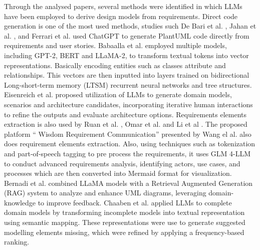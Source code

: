 Through the analysed papers, several methods were identified in which LLMs have been employed to derive design models from requirements. 
Direct code generation is one of the most used methods, studies such De Bari et al. \cite{1deBari2024}, Jahan et al. \cite{4jahan2024}, and Ferrari et al. \cite{5ferrari2024} used ChatGPT to generate PlantUML \cite{plantuml} code directly from requirements and user stories.
Babaalla et al. \cite{2babaalla2024} employed multiple models, including GPT-2, BERT and LLaMA-2, to transform textual tokens into vector representations. Basically encoding entities such as classes attribute and relationships. This vectors are then inputted into layers trained on bidirectional Long-short-term memory (LTSM) recurrent neural networks and tree structures.
Eisenreich et al. \cite{7eisenreich2024} proposed utilization of LLMs to generate domain models, scenarios and architecture candidates, incorporating iterative human interactions to refine the outputs and evaluate architecture options. 
Requirements elements extraction is also used by Ruan et al. \cite{9ruan2023}, Omar et al. \cite{11omar2023} and Li et al \cite{12li2024}. 
The proposed platform “ Wisdom Requirement Communication” presented by Wang el al. \cite{8z_wang2024} also does requirement elements extraction. Also, using techniques such as tokenization and part-of-speech tagging to pre process the requirements,  it uses GLM 4-LLM to conduct advanced requirements analysis, identifying actors, use cases, and processes which are then converted into Mermaid format for visualization.
Bernadi et al. \cite{13benardi2024} combined LLaMA models with a Retrieval Augmented Generation (RAG) system to analyze and enhance UML diagrams, leveraging domain-knowledge to improve feedback.
Chaaben et al. \cite{14chaaben2023} applied LLMs to complete domain models by transforming incomplete models into textual representation using semantic mapping. These representations were use to generate suggested modelling elements missing, which were refined by applying a frequency-based ranking.


